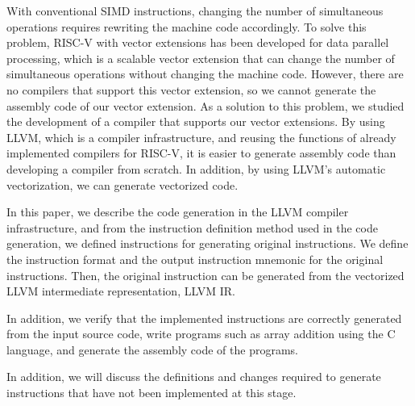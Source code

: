 With conventional SIMD instructions, changing the number of simultaneous operations requires rewriting the machine code accordingly.
To solve this problem, RISC-V with vector extensions has been developed for data parallel processing, which is a scalable vector extension that can change the number of simultaneous operations without changing the machine code.
However, there are no compilers that support this vector extension, so we cannot generate the assembly code of our vector extension. As a solution to this problem, we studied the development of a compiler that supports our vector extensions. By using LLVM, which is a compiler infrastructure, and reusing the functions of already implemented compilers for RISC-V, it is easier to generate assembly code than developing a compiler from scratch. In addition, by using LLVM's automatic vectorization, we can generate vectorized code.

In this paper, we describe the code generation in the LLVM compiler infrastructure, and from the instruction definition method used in the code generation, we defined instructions for generating original instructions. We define the instruction format and the output instruction mnemonic for the original instructions. Then, the original instruction can be generated from the vectorized LLVM intermediate representation, LLVM IR.

In addition, we verify that the implemented instructions are correctly generated from the input source code, write programs such as array addition using the C language, and generate the assembly code of the programs.

In addition, we will discuss the definitions and changes required to generate instructions that have not been implemented at this stage.